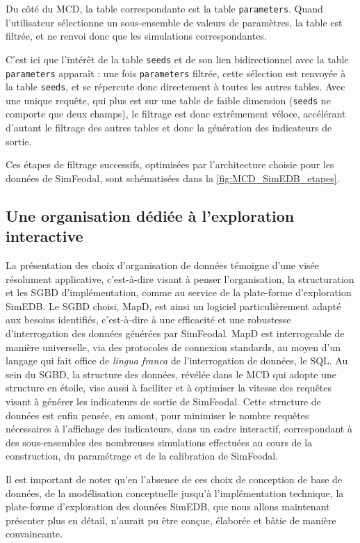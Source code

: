		Du côté du MCD, la table correspondante est la table \texttt{parameters}. Quand l'utilisateur sélectionne un sous-ensemble de valeurs de paramètres, la table est filtrée, et ne renvoi donc que les simulations correspondantes.

		C'est ici que l'intérêt de la table \texttt{seeds} et de son lien bidirectionnel avec la table \texttt{parameters} apparaît : une fois \texttt{parameters} filtrée, cette sélection est renvoyée à la table \texttt{seeds}, et se répercute donc directement à toutes les autres tables.
		Avec une unique requête, qui plus est sur une table de faible dimension (\texttt{seeds} ne comporte que deux champs), le filtrage est donc extrêmement véloce, accélérant d'autant le filtrage des autres tables et donc la génération des indicateurs de sortie.

		Ces étapes de filtrage successifs, optimisées par l'architecture choisie pour les données de SimFeodal, sont schématisées dans la \cref{fig:MCD_SimEDB_etapes}.


		\subsection*{Une organisation dédiée à l'exploration interactive}
		La présentation des choix d'organisation de données témoigne d'une visée résolument applicative, c'est-à-dire visant à penser l'organisation, la structuration et les SGBD d'implémentation, comme au service de la plate-forme d'exploration SimEDB.
		Le SGBD choisi, MapD, est ainsi un logiciel particulièrement adapté aux besoins identifiés, c'est-à-dire à une efficacité et une robustesse d'interrogation des données générées par SimFeodal.
		MapD est interrogeable de manière universelle, via des protocoles de connexion standards, au moyen d'un langage qui fait office de \textit{lingua franca} de l'interrogation de données, le SQL.
		Au sein du SGBD, la structure des données, révélée dans le MCD qui adopte une structure \og en étoile\fg{}, vise aussi à faciliter et à optimiser la vitesse des requêtes visant à générer les indicateurs de sortie de SimFeodal.
		Cette structure de données est enfin pensée, en amont, pour minimiser le nombre requêtes nécessaires à l'affichage des indicateurs, dans un cadre interactif, correspondant à des sous-ensembles des nombreuses simulations effectuées au cours de la construction, du paramétrage et de la calibration de SimFeodal.

		Il est important de noter qu'en l'absence de ces choix de conception de base de données, de la modélisation conceptuelle jusqu'à l'implémentation technique, la plate-forme d'exploration des données SimEDB, que nous allons maintenant présenter plus en détail, n'aurait pu être conçue, élaborée et bâtie de manière convaincante.


